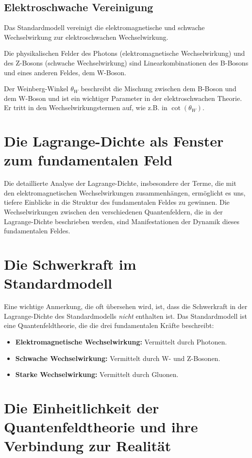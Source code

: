 \documentclass{article}
\begin{document}
	\subsection{Elektroschwache Vereinigung}
	
	Das Standardmodell vereinigt die elektromagnetische und schwache Wechselwirkung zur elektroschwachen Wechselwirkung.
	
	Die physikalischen Felder des Photons (elektromagnetische Wechselwirkung) und des Z-Bosons (schwache Wechselwirkung) sind Linearkombinationen des B-Bosons und eines anderen Feldes, dem W-Boson.
	
	Der Weinberg-Winkel $\theta_W$ beschreibt die Mischung zwischen dem B-Boson und dem W-Boson und ist ein wichtiger Parameter in der elektroschwachen Theorie. Er tritt in den Wechselwirkungstermen auf, wie z.B. in $\cot(\theta_W)$.
	
	\section{Die Lagrange-Dichte als Fenster zum fundamentalen Feld}
	
	Die detaillierte Analyse der Lagrange-Dichte, insbesondere der Terme, die mit den elektromagnetischen Wechselwirkungen zusammenhängen, ermöglicht es uns, tiefere Einblicke in die Struktur des fundamentalen Feldes zu gewinnen. Die Wechselwirkungen zwischen den verschiedenen Quantenfeldern, die in der Lagrange-Dichte beschrieben werden, sind Manifestationen der Dynamik dieses fundamentalen Feldes.
\section{Die Schwerkraft im Standardmodell}

Eine wichtige Anmerkung, die oft übersehen wird, ist, dass die Schwerkraft in der Lagrange-Dichte des Standardmodells \textit{nicht} enthalten ist. Das Standardmodell ist eine Quantenfeldtheorie, die die drei fundamentalen Kräfte beschreibt:

\begin{itemize}
	\item \textbf{Elektromagnetische Wechselwirkung:} Vermittelt durch Photonen.
	\item \textbf{Schwache Wechselwirkung:} Vermittelt durch W- und Z-Bosonen.
	\item \textbf{Starke Wechselwirkung:} Vermittelt durch Gluonen.
\end{itemize}
\section{Die Einheitlichkeit der Quantenfeldtheorie und ihre Verbindung zur Realität}
\end{document}
